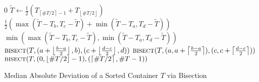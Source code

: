 

\begin{algorithm}[h]
\begin{algorithmic}[1]
\State \Return $0$
\EndIf
{}
\State $\widetilde{T} \leftarrow \frac{1}{2}(T_{\left \lceil{\# T /2 }\right \rceil - 1} + T_{\left \lfloor{\# T /2 }\right \rfloor})$
\State \Return $\frac{1}{2} ( \max(\widetilde{T} - T_{b},T_{c} - \widetilde{T} ) + \min(\widetilde{T} - T_{a},T_{d} - \widetilde{T}) )$
\Else
\State \Return $\min(\max(\widetilde{T} - T_{b},T_{c} - \widetilde{T} ),\min(\widetilde{T} - T_{a},T_{d} - \widetilde{T}))$
\EndIf
\EndIf
{}
\State \Return $\Call{bisect}{T,(a+\left \lfloor \frac{b-a}{2}\right \rfloor,b),(c+\left \lfloor \frac{d-c}{2}\right \rfloor,d)}$
\Else
\State \Return $\Call{bisect}{T,(a,a+\left \lceil \frac{b-a}{2}\right \rceil),(c,c+\left \lceil \frac{d-c}{2}\right \rceil)}$
\EndIf
\EndFunction
\State \Return $\Call{bisect}{T,(0,\left \lfloor{\# T /2 }\right \rfloor - 1),(\left \lceil{\# T /2 }\right \rceil,\#T - 1)}$
\EndFunction
\end{algorithmic}
\caption{\label{alg:mad-sorted} Median Absolute Deviation of a Sorted Container $T$ via Bisection}
\end{algorithm}
